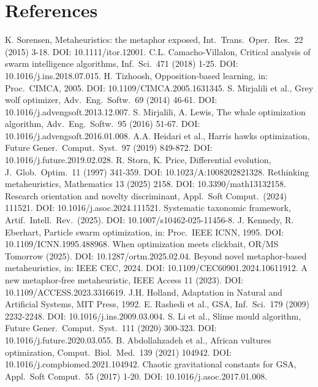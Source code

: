 \documentclass[review]{elsarticle}
\theoremstyle{definition}
\begin{document}
\section*{References}

\begin{enumerate}
 K. Sorensen, Metaheuristics: the metaphor exposed, Int.\ Trans.\ Oper.\ Res.\ 22 (2015) 3-18. DOI: 10.1111/itor.12001.
 C.L. Camacho-Villalon, Critical analysis of swarm intelligence algorithms, Inf.\ Sci.\ 471 (2018) 1-25. DOI: 10.1016/j.ins.2018.07.015.
 H. Tizhoosh, Opposition-based learning, in: Proc.\ CIMCA, 2005. DOI: 10.1109/CIMCA.2005.1631345.
 S. Mirjalili et al., Grey wolf optimizer, Adv.\ Eng.\ Softw.\ 69 (2014) 46-61. DOI: 10.1016/j.advengsoft.2013.12.007.
 S. Mirjalili, A. Lewis, The whale optimization algorithm, Adv.\ Eng.\ Softw.\ 95 (2016) 51-67. DOI: 10.1016/j.advengsoft.2016.01.008.
 A.A. Heidari et al., Harris hawks optimization, Future Gener.\ Comput.\ Syst.\ 97 (2019) 849-872. DOI: 10.1016/j.future.2019.02.028.
 R. Storn, K. Price, Differential evolution, J.\ Glob.\ Optim.\ 11 (1997) 341-359. DOI: 10.1023/A:1008202821328.
 Rethinking metaheuristics, Mathematics 13 (2025) 2158. DOI: 10.3390/math13132158.
 Research orientation and novelty discriminant, Appl.\ Soft Comput.\ (2024) 111521. DOI: 10.1016/j.asoc.2024.111521.
 Systematic taxonomic framework, Artif.\ Intell.\ Rev.\ (2025). DOI: 10.1007/s10462-025-11456-8.
 J. Kennedy, R. Eberhart, Particle swarm optimization, in: Proc.\ IEEE ICNN, 1995. DOI: 10.1109/ICNN.1995.488968.
 When optimization meets clickbait, OR/MS Tomorrow (2025). DOI: 10.1287/ortm.2025.02.04.
 Beyond novel metaphor-based metaheuristics, in: IEEE CEC, 2024. DOI: 10.1109/CEC60901.2024.10611912.
 A new metaphor-free metaheuristic, IEEE Access 11 (2023). DOI: 10.1109/ACCESS.2023.3316619.
 J.H. Holland, Adaptation in Natural and Artificial Systems, MIT Press, 1992.
 E. Rashedi et al., GSA, Inf.\ Sci.\ 179 (2009) 2232-2248. DOI: 10.1016/j.ins.2009.03.004.
 S. Li et al., Slime mould algorithm, Future Gener.\ Comput.\ Syst.\ 111 (2020) 300-323. DOI: 10.1016/j.future.2020.03.055.
 B. Abdollahzadeh et al., African vultures optimization, Comput.\ Biol.\ Med.\ 139 (2021) 104942. DOI: 10.1016/j.compbiomed.2021.104942.
 Chaotic gravitational constants for GSA, Appl.\ Soft Comput.\ 55 (2017) 1-20. DOI: 10.1016/j.asoc.2017.01.008.

\end{enumerate}
\end{document}
